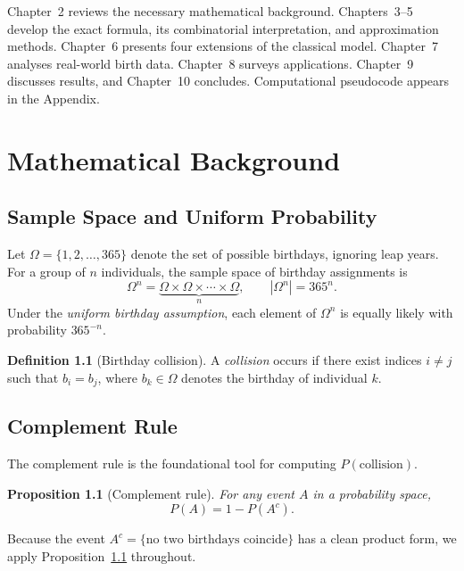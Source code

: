 \documentclass[12pt]{report}
\newtheorem{proposition}[theorem]{Proposition}
\theoremstyle{definition}
\newtheorem{definition}[theorem]{Definition}
\begin{document}
Chapter~2 reviews the necessary mathematical background.  Chapters~3–5 develop the
exact formula, its combinatorial interpretation, and approximation methods.
Chapter~6 presents four extensions of the classical model.  Chapter~7 analyses
real-world birth data.  Chapter~8 surveys applications.  Chapter~9 discusses results,
and Chapter~10 concludes.  Computational pseudocode appears in the Appendix.

\chapter{Mathematical Background}

\section{Sample Space and Uniform Probability}

Let $\Omega = \{1, 2, \ldots, 365\}$ denote the set of possible birthdays, ignoring
leap years.  For a group of $n$ individuals, the sample space of birthday assignments
is
\[
  \Omega^n = \underbrace{\Omega \times \Omega \times \cdots \times \Omega}_{n},
  \qquad |\Omega^n| = 365^n.
\]
Under the \emph{uniform birthday assumption}, each element of $\Omega^n$ is equally
likely with probability $365^{-n}$.

\begin{definition}[Birthday collision]
  A \emph{collision} occurs if there exist indices $i \neq j$ such that
  $b_i = b_j$, where $b_k \in \Omega$ denotes the birthday of individual $k$.
\end{definition}

\section{Complement Rule}

The complement rule is the foundational tool for computing $P(\text{collision})$.

\begin{proposition}[Complement rule]
\label{prop:complement}
  For any event $A$ in a probability space,
  \[
    P(A) = 1 - P(A^c).
  \]
\end{proposition}

Because the event $A^c = \{\text{no two birthdays coincide}\}$ has a clean product
form, we apply Proposition~\ref{prop:complement} throughout.
\end{document}
